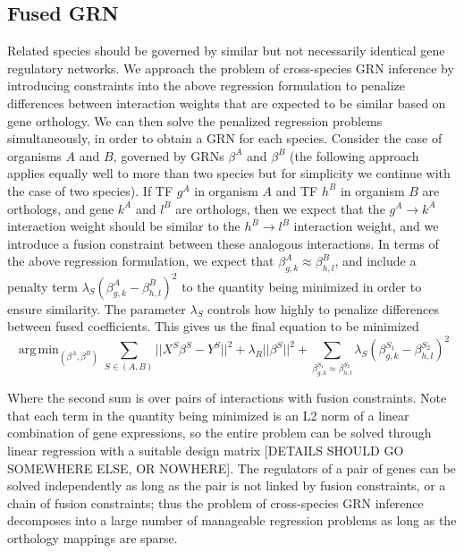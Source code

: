 \documentclass[11pt]{article}
\DeclareMathOperator*{\argmin}{arg\,min}
\begin{document}
\subsection{Fused GRN}
Related species should be governed by similar but not necessarily identical gene regulatory networks. We approach the problem of cross-species GRN inference by introducing constraints into the above regression formulation to penalize differences between interaction weights that are expected to be similar based on gene orthology. We can then solve the penalized regression problems simultaneously, in order to obtain a GRN for each species. Consider the case of organisms $A$ and $B$, governed by GRNs $\beta^A$ and $\beta^B$ (the following approach applies equally well to more than two species but for simplicity we continue with the case of two species). If TF $g^A$ in organism $A$ and TF $h^B$ in organism $B$ are orthologs, and gene $k^A$ and $l^B$ are orthologs, then we expect that the $g^A \rightarrow k^A$ interaction weight should be similar to the $h^B \rightarrow l^B$ interaction weight, and we introduce a fusion constraint between these analogous interactions. In terms of the above regression formulation, we expect that $\beta^A_{g,k} \approx \beta^B_{h,l}$, and include a penalty term $\lambda_S(\beta^A_{g,k} - \beta^B_{h,l})^2$ to the quantity being minimized in order to ensure similarity. The parameter $\lambda_S$ controls how highly to penalize differences between fused coefficients. This gives us the final equation to be minimized 
\begin{equation}
\argmin_{(\beta^A, \beta^B)} \displaystyle\sum_{S \in (A, B)} \vert \vert X^S\beta^S - Y^S \vert \vert ^2 + \lambda_R \vert \vert \beta^S \vert \vert ^2 + \displaystyle \sum_{\beta^{S_1}_{g,k} \approx \beta^{S_2}_{h,l}} \lambda_S(\beta^{S_1}_{g,k} - \beta^{S_2}_{h,l})^2
\end{equation}

Where the second sum is over pairs of interactions with fusion constraints. Note that each term in the quantity being minimized is an L2 norm of a linear combination of gene expressions, so the entire problem can be solved through linear regression with a suitable design matrix [DETAILS SHOULD GO SOMEWHERE ELSE, OR NOWHERE]. The regulators of a pair of genes can be solved independently as long as the pair is not linked by fusion constraints, or a chain of fusion constraints; thus the problem of cross-species GRN inference decomposes into a large number of manageable regression problems as long as the orthology mappings are sparse.
\end{document}
